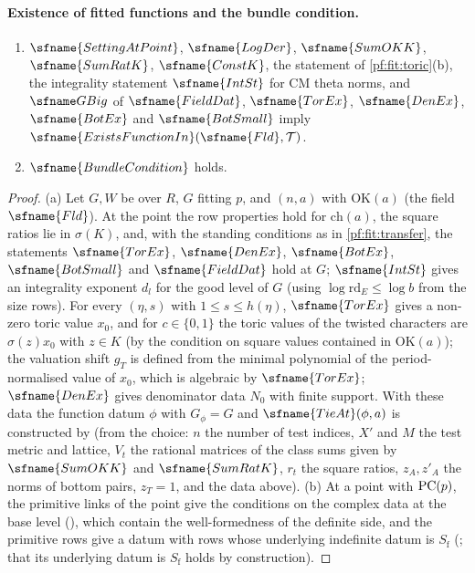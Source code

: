 \paragraph{Existence of fitted functions and the bundle condition.}
\begin{lemma}\label{pf:fit:leafex}
\begin{enumerate}[label=(\alph*)]
\item $\sfname{SettingAtPoint}$, $\sfname{LogDer}$, $\sfname{SumOKK}$, $\sfname{SumRatK}$, $\sfname{ConstK}$, the statement of
\cref{pf:fit:toric}(b), the integrality statement $\sfname{IntSt}$ for CM theta norms, and $\fitGBig$ of $\sfname{FieldDat}$,
$\sfname{TorEx}$, $\sfname{DenEx}$, $\sfname{BotEx}$ and $\sfname{BotSmall}$ imply $\sfname{ExistsFunctionIn}(\sfname{Fld},\mathcal T)$.
\item $\sfname{BundleCondition}$ holds.
\end{enumerate}
\end{lemma}

\begin{proof}
(a) Let $G,W$ be over $R$, $G$ fitting $p$, and $(n,a)$ with $\mathrm{OK}(a)$ (the field $\sfname{Fld}$). At the point the row
properties hold for $\mathrm{ch}(a)$, the square ratios lie in $\sigma(K)$, and, with the standing conditions as in
\cref{pf:fit:transfer}, the statements $\sfname{TorEx}$, $\sfname{DenEx}$, $\sfname{BotEx}$, $\sfname{BotSmall}$ and
$\sfname{FieldDat}$ hold at $G$; $\sfname{IntSt}$ gives an integrality exponent $d_l$ for the good level of $G$ (using
$\log\mathrm{rd}_E\le\log b$ from the size rows). For every $(\eta,s)$ with $1\le s\le h(\eta)$, $\sfname{TorEx}$ gives a
non-zero toric value $x_0$, and for $c\in\{0,1\}$ the toric values of the twisted characters are $\sigma(z)x_0$ with $z\in K$
(by the condition on square values contained in $\mathrm{OK}(a)$); the valuation shift $g_T$ is defined from the minimal
polynomial of the period-normalised value of $x_0$, which is algebraic by $\sfname{TorEx}$; $\sfname{DenEx}$ gives denominator
data $N_0$ with finite support. With these data the function datum $\phi$
with $G_\phi=G$ and $\sfname{TieAt}(\phi,a)$ is constructed by  (from the choice:
$n$ the number of test indices, $X'$ and $M$ the test metric and lattice, $V_t$ the rational matrices of the class sums given by
$\sfname{SumOKK}$ and $\sfname{SumRatK}$, $r_t$ the square ratios, $z_A,z'_A$ the norms of bottom pairs, $z_T=1$, and the data
above).
(b) At a point with $\mathrm{PC}(p)$, the primitive links of the point give the conditions on the complex data at the base level
(), which contain the well-formedness of the
definite side, and the primitive rows give a datum with rows whose underlying indefinite datum is $S_{\mathrm f}$
(; that its underlying datum is $S_{\mathrm f}$ holds by construction).
\end{proof}

